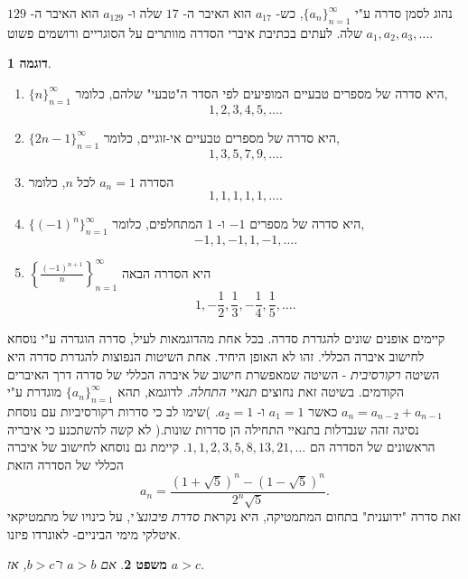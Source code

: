 \documentclass[12pt]{book}
\theoremstyle{plain}
\newtheorem{theorem}{משפט}[chapter]
\theoremstyle{definition}
\newtheorem{example}[theorem]{דוגמה}
\begin{document}
נהוג לסמן סדרה ע"י 
$\{a_n\}_{n=1}^\infty$, 
כש- 
$a_{17}$ 
הוא האיבר ה- 
$17$ 
שלה ו- 
$a_{129}$ 
הוא האיבר ה- 
$129$ 
שלה. 
לעתים בכתיבת איברי הסדרה מוותרים על הסוגריים ורושמים פשוט 
$a_1,a_2,a_3,\ldots$. 

\begin{example}\rm
    \begin{enumerate}
         \item 
$\{n\}_{n=1}^\infty$ 
היא סדרה של מספרים טבעיים המופיעים לפי הסדר ה"טבעי" שלהם, כלומר,
$$1,2,3,4,5,\ldots.$$
\item $\{2n-1\}_{n=1}^\infty$ 
היא סדרה של מספרים טבעיים אי-זוגיים, 
כלומר, 
$$1,3,5,7,9,\ldots.$$
\item הסדרה 
$a_n=1$ 
לכל 
$n$, 
כלומר 
$$1,1,1,1,1,\ldots.$$
\item $\{(-1)^n\}_{n=1}^\infty$ 
היא סדרה של מספרים 
$-1$ 
ו- 
$1$ 
המתחלפים, כלומר, 
$$-1,1,-1,1,-1,\ldots.$$
\item $\left\{\frac{(-1)^{n+1}}{n}\right\}_{n=1}^\infty$ 
היא הסדרה הבאה 
$$1,-\frac{1}{2},\frac{1}{3},-\frac{1}{4},\frac{1}{5},\ldots.$$
    \end{enumerate}
\end{example}



קיימים אופנים שונים להגדרת סדרה. בכל אחת מהדוגמאות לעיל, סדרה הוגדרה ע"י נוסחא לחישוב איברה הכללי. 
זהו לא האופן היחיד. 
אחת השיטות הנפוצות להגדרת סדרה היא השיטה 
{\it רקורסיבית} - 
השיטה שמאפשרת חישוב של איברה הכללי של סדרה דרך האיברים הקודמים. בשיטה זאת נחוצים 
{\it תנאיי התחלה}. 
לדוגמא, 
תהא 
$\{a_n\}_{n=1}^\infty$ 
מוגדרת ע"י 
$a_{n}=a_{n-2}+a_{n-1}$ 
כאשר 
$a_1=1$
ו- 
$a_2=1$. 
)שימו לב כי סדרות רקורסיביות עם נוסחת נסיגה זהה שנבדלות בתנאיי התחילה הן סדרות שונות.(
לא קשה להשתכנע כי איבריה הראשונים של הסדרה הם
$1,1,2,3,5,8,13,21,\ldots$. 
קיימת גם נוסחא לחישוב של איברה הכללי של הסדרה הזאת
$$a_n=\frac{(1+\sqrt{5})^n-(1-\sqrt{5})^n}{2^n\sqrt{5}}.$$
זאת סדרה "ידוענית" בתחום המתמטיקה, היא נקראת 
{\it סדרת פיבונצ'י}, 
על כינויו של מתמטיקאי איטלקי מימי הביניים- לאונרדו פיזנו.

\begin{theorem}
אם \( a > b \) ו־\( b > c \), אז \( a > c \).
\end{theorem}
\end{document}
